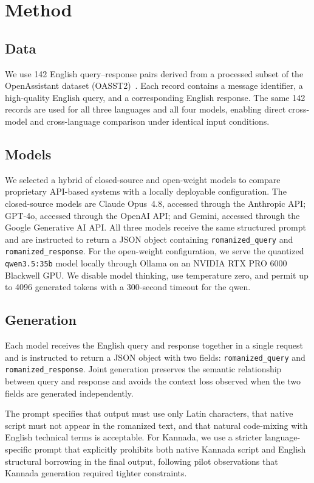 \section{Method}

\subsection{Data}

We use 142 English query--response pairs derived from a processed subset of the
OpenAssistant dataset (OASST2)~\cite{kopf2023openassistant}. Each record contains a message identifier, a
high-quality English query, and a corresponding English response. The same 142
records are used for all three languages and all four models, enabling direct
cross-model and cross-language comparison under identical input conditions.

\subsection{Models}

We selected a hybrid of closed-source and open-weight models to compare
proprietary API-based systems with a locally deployable configuration. The
closed-source models are Claude Opus~4.8, accessed through the Anthropic API;
GPT-4o, accessed through the OpenAI API; and Gemini, accessed through the
Google Generative AI API. All three models receive the same structured prompt
and are instructed to return a JSON object containing
\texttt{romanized\_query} and \texttt{romanized\_response}. For the
open-weight configuration, we serve the quantized
\texttt{qwen3.5:35b} model locally through Ollama on an NVIDIA RTX PRO 6000
Blackwell GPU. We disable model thinking, use temperature zero, and permit up
to 4096 generated tokens with a 300-second timeout for the qwen.

\subsection{Generation}

Each model receives the English query and response together in a single request
and is instructed to return a JSON object with two fields:
\texttt{romanized\_query} and \texttt{romanized\_response}. Joint generation
preserves the semantic relationship between query and response and avoids the
context loss observed when the two fields are generated independently.

The prompt specifies that output must use only Latin characters, that native
script must not appear in the romanized text, and that natural code-mixing with
English technical terms is acceptable. For Kannada, we use a stricter
language-specific prompt that explicitly prohibits both native Kannada script
and English structural borrowing in the final output, following pilot
observations that Kannada generation required tighter constraints.

